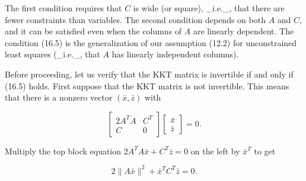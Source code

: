 The first condition requires that \(C\) is wide (or square), _i.e._, that there are fewer constraints than variables. The second condition depends on both \(A\) and \(C\), and it can be satisfied even when the columns of \(A\) are linearly dependent. The condition (16.5) is the generalization of our assumption (12.2) for unconstrained least squares (_i.e._, that \(A\) has linearly independent columns).

Before proceeding, let us verify that the KKT matrix is invertible if and only if (16.5) holds. First suppose that the KKT matrix is not invertible. This means that there is a nonzero vector \((\bar{x},\bar{z})\) with

\[\left[\begin{array}{cc}2A^{T}A&C^{T}\\ C&0\end{array}\right]\left[\begin{array}{c}\bar{x}\\ \bar{z}\end{array}\right]=0.\]

Multiply the top block equation \(2A^{T}A\bar{x}+C^{T}\bar{z}=0\) on the left by \(\bar{x}^{T}\) to get

\[2\|A\bar{x}\|^{2}+\bar{x}^{T}C^{T}\bar{z}=0.\] 